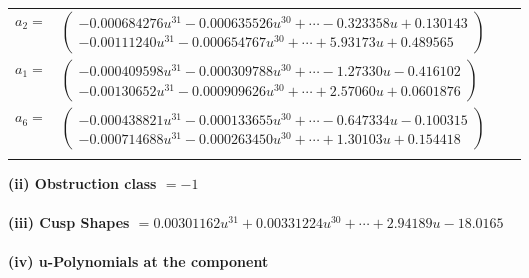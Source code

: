 \documentclass[1p]{elsarticle_modified}
\theoremstyle{definition}
\begin{document}
\begin{tabular}{m{7pt} m{180pt} m{7pt} m{180pt} }
\flushright $a_{2}=$&$\begin{pmatrix}-0.000684276 u^{31}-0.000635526 u^{30}+\cdots-0.323358 u+0.130143\\-0.00111240 u^{31}-0.000654767 u^{30}+\cdots+5.93173 u+0.489565\end{pmatrix}$ \\
\flushright $a_{1}=$&$\begin{pmatrix}-0.000409598 u^{31}-0.000309788 u^{30}+\cdots-1.27330 u-0.416102\\-0.00130652 u^{31}-0.000909626 u^{30}+\cdots+2.57060 u+0.0601876\end{pmatrix}$ \\
\flushright $a_{6}=$&$\begin{pmatrix}-0.000438821 u^{31}-0.000133655 u^{30}+\cdots-0.647334 u-0.100315\\-0.000714688 u^{31}-0.000263450 u^{30}+\cdots+1.30103 u+0.154418\end{pmatrix}$\\&\end{tabular}
\flushleft \textbf{(ii) Obstruction class $= -1$}\\~\\
\flushleft \textbf{(iii) Cusp Shapes $= 0.00301162 u^{31}+0.00331224 u^{30}+\cdots+2.94189 u-18.0165$}\\~\\
\newpage\renewcommand{\arraystretch}{1}
\flushleft \textbf{(iv) u-Polynomials at the component}\newline \\
\end{document}
